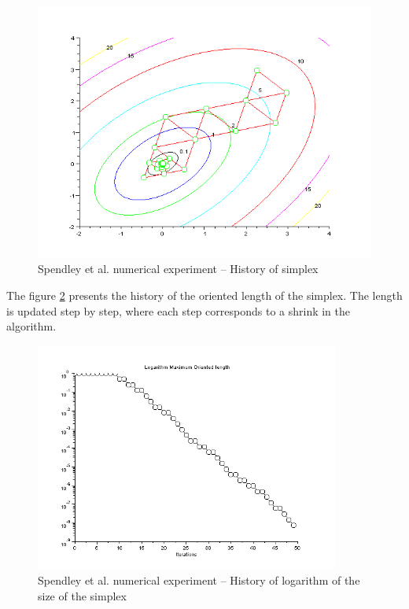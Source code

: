 \begin{figure}
\begin{center}
\includegraphics[width=15cm]{quad2bis-spendley-simplexcontours.png}
\end{center}
\caption{Spendley et al. numerical experiment -- History of simplex}
\label{fig-spendley-numexp1-historysimplex}
\end{figure}

The figure \ref{fig-spendley-numexp1-sigma} presents the history of the oriented
length of the simplex. The length is updated step by step, where each step 
corresponds to a shrink in the algorithm.

\begin{figure}
\begin{center}
\includegraphics[width=10cm]{quad2bis-spendley-history-sigma.png}
\end{center}
\caption{Spendley et al. numerical experiment -- History of logarithm of the size of the simplex}
\label{fig-spendley-numexp1-sigma}
\end{figure}


